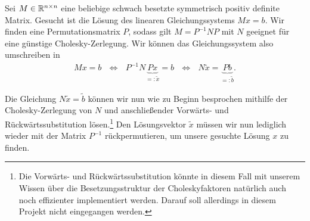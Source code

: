 Sei $M \in \mathbb{R}^{n \times n}$ eine beliebige schwach besetzte symmetrisch positiv definite Matrix. Gesucht ist die Lösung des linearen Gleichungssystems $Mx=b$. Wir finden eine Permutationsmatrix $P$, sodass gilt $M = P^{-1}NP$ mit $N$ geeignet für eine günstige Cholesky-Zerlegung. Wir können das Gleichungssystem also umschreiben in
\begin{align*}
    Mx = b \text{~~} \Leftrightarrow \text{~~} P^{-1}N\underbrace{Px}_{=\colon\widetilde{x}} = b \text{~~} \Leftrightarrow \text{~~} N\widetilde{x} = \underbrace{Pb}_{=\colon\widetilde{b}}.
\end{align*}

Die Gleichung $ N\widetilde{x} = \widetilde{b}$ können wir nun wie zu Beginn besprochen mithilfe der Cholesky-Zerlegung von $N$ und anschließender Vorwärts- und Rückwärtssubstitution lösen.\footnote{Die Vorwärts- und Rückwärtssubstitution könnte in diesem Fall mit unserem Wissen über die Besetzungsstruktur der Choleskyfaktoren natürlich auch noch effizienter implementiert werden. Darauf soll allerdings in diesem Projekt nicht eingegangen werden.} Den Lösungsvektor $\widetilde{x}$ müssen wir nun lediglich wieder mit der Matrix $P^{-1}$ rückpermutieren, um unsere gesuchte Lösung $x$ zu finden.
